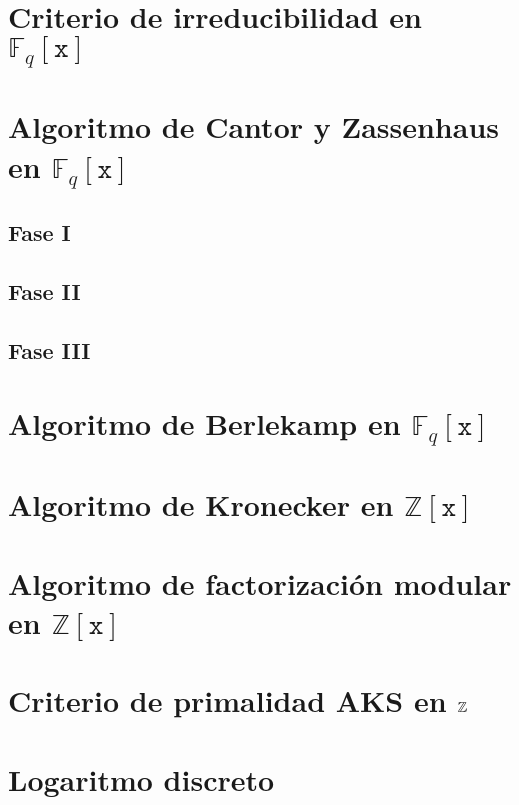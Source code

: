 \documentclass[a4paper, 11pt, twoside, notitlepage, openany, onecolumn, final]{report}
\begin{document}
	\section{Criterio de irreducibilidad en $\mathbb{F}_q[\texttt{x}]$}
	\section{Algoritmo de Cantor y Zassenhaus en $\mathbb{F}_q[\texttt{x}]$}
	\subsection{Fase I}
	\subsection{Fase II}
	\subsection{Fase III}
	\section{Algoritmo de Berlekamp en $\mathbb{F}_q[\texttt{x}]$}
	\section{Algoritmo de Kronecker en $\mathbb{Z}[\texttt{x}]$}
	\section{Algoritmo de factorización modular en $\mathbb{Z}[\texttt{x}]$}
	\section{Criterio de primalidad AKS en $\mathbb{Z}$}
	\section{Logaritmo discreto}
\end{document}
